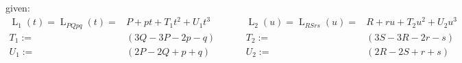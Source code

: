 \documentclass[10pt]{article}
\DeclareMathOperator{\Lspline}{L}
\begin{document}
    given:
    $$\begin{aligned}
        \Lspline_1(t) = \Lspline_{PQpq}(t) =& P + pt + T_1t^2 + U_1t^3 & \hspace{1cm}
        \Lspline_2(u) = \Lspline_{RSrs}(u) =& R + ru + T_2u^2 + U_2u^3 \\
        T_1 :=& (3Q-3P-2p-q) & \hspace{1cm}
        T_2 :=& (3S-3R-2r-s) \\
        U_1 :=& (2P-2Q+p+q)  & \hspace{1cm}
        U_2 :=& (2R-2S+r+s) \\
    \end{aligned}$$
\end{document}
